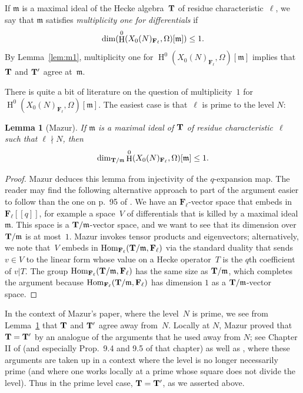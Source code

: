\documentclass[10pt,twoside]{article}
\newcommand{\edit}[1]{\footnote{EDIT: #1}\marginpar{\hfill {\sf \thefootnote}}}
\newcommand{\F}{{\bf{F}}}
\newcommand{\T}{{\bf{T}}}
\newcommand{\m}{{\mathfrak{m}}}
\newcommand{\Hom}{{\rm Hom}}
\newcommand{\Fell}{\mathbf{F}_\ell}
\renewcommand{\H}{\HHH}
\newtheorem{lem}{Lemma}[section]
\theoremstyle{definition}
\DeclareMathOperator{\HHH}{H}
\begin{document}
If $\m$ is a maximal ideal of the Hecke algebra~$\T$ 
of residue characteristic~$\ell$, we say that
$\m$ satisfies {\em multiplicity one for differentials} if 
$$
\dim (\H^0(X_0(N)_{\F_\ell},\Omega)[\m]) \leq 1.
$$
By Lemma~\ref{lem:m1}, multiplicity one for 
$\H^0(X_0(N)_{\Fell}, \Omega)[\m]$ implies that $\T$ and
$\T'$ agree at~$\m$.

There is quite a bit of literature on the question of multiplicity~$1$
for $\H^0(X_0(N)_{\Fell},\Omega)[\m]$.  
The easiest case is that~$\ell$ is prime to the level $N$: 

\begin{lem}[Mazur]\label{lem:m_ell}
If $\m$ is a maximal ideal of $\T$ of residue characteristic~$\ell$
such that $\ell \nmid N$, then 
$$\dim_{\T/\m} \H^0(X_0(N)_{\Fell},\Omega)[\m] \leq 1.$$ 
\end{lem}

\begin{proof} 
  Mazur deduces this lemma from injectivity of the $q$-expansion map.
  The reader may find the following alternative approach to part of
  the argument easier to follow than the one on p.~95 of
  \cite{mazur:eisenstein}.  We have an $\Fell$-vector space that
  embeds in $\Fell[[q]]$, for example a space~$V$ of differentials
  that is killed by a maximal ideal $\m$.  This space is a
  $\T/\m$-vector space, and we want to see that its dimension over
  $\T/\m$ is at most~$1$.  Mazur invokes tensor products and
  eigenvectors; alternatively, we note that~$V$ embeds in
  $\Hom_{\Fell}(\T/\m,\Fell)$ via the standard duality that
  sends~$v\in V$ to the linear form whose value on a Hecke
  operator~$T$ is the $q$th coefficient of $v{|T}$.  The group
  $\Hom_{\Fell}(\T/\m,\Fell)$ has the same size as $\T/\m$, which
  completes the argument because $\Hom_{\Fell}(\T/\m,\Fell)$ has
  dimension $1$ as a $\T/\m$-vector space.
\end{proof}

In the context of Mazur's paper, where the level~$N$ is prime, we see
from Lemma~\ref{lem:m_ell} that $\T$ and $\T'$ agree away from~$N$.
Locally at $N$, Mazur proved that $\T=\T'$ by an analogue of the
arguments that he used away from $N$; see Chapter II of
\cite{mazur:eisenstein} (and especially Prop.~9.4 and 9.5 of that
chapter) as well as \cite{mazur-ribet}, where these arguments are
taken up in a context where the level is no longer necessarily prime
(and where one works locally at a prime whose square does not divide
the level).  
Thus in the prime level case, $\T=\T'$, as we asserted above.
\end{document}
